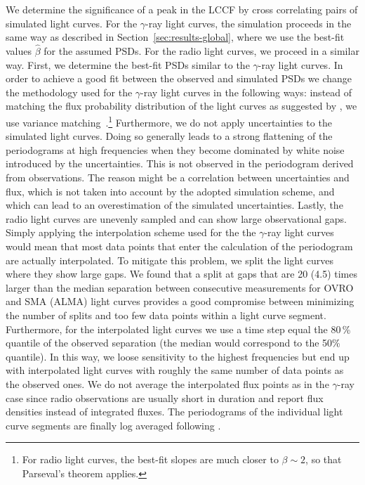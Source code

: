 \documentclass[twocolumn,linenumbers]{aastex62}
\newcommand{\gray}{$\gamma$-ray\xspace}
\begin{document}
We determine the significance of a peak in the LCCF by cross correlating pairs of simulated light curves. 
For the \gray light curves, the simulation proceeds in the same way as described in Section~\ref{sec:results-global}, where we use the best-fit values $\hat{\beta}$ for the assumed PSDs.
For the radio light curves, we proceed in a similar way. 
First, we determine the best-fit PSDs similar to the \gray light curves. 
In order to achieve a good fit between the observed and simulated PSDs we change the methodology used for the \gray light curves in the following ways:
instead of matching the flux probability distribution of the light curves as suggested by \citet{2013MNRAS.433..907E}, we use variance matching~\citep{2014MNRAS.445..437M}.\footnote{For radio light curves, the best-fit slopes are much closer to $\beta \sim 2$, so that Parseval's theorem applies.}
Furthermore, we do not apply uncertainties to the simulated light curves. 
Doing so generally leads to a strong flattening of the periodograms at high frequencies when they become dominated by white noise introduced by the uncertainties. 
This is not observed in the periodogram derived from observations. 
The reason might be a correlation between uncertainties and flux, which is not taken into account by the adopted simulation scheme, and which can lead to an overestimation of the simulated uncertainties.
Lastly, the radio light curves are unevenly sampled and can show large observational gaps. 
Simply applying the interpolation scheme used for the the \gray light curves would mean that most data points that enter the calculation of the periodogram are actually interpolated. 
To mitigate this problem, we split the light curves where they show large gaps. 
We found that a split at gaps that are 20 (4.5) times larger than the median separation between consecutive measurements for OVRO and SMA (ALMA) light curves provides a good compromise between minimizing the number of splits and too few data points within a light curve segment. 
Furthermore, for the interpolated light curves we use a time step equal the 80\,\% quantile of the observed separation (the median would correspond to the 50\% quantile). 
In this way, we loose sensitivity to the highest frequencies but end up with interpolated light curves with roughly the same number of data points as the observed ones. 
We do not average the interpolated flux points as in the \gray case since radio observations are usually short in duration and report flux densities instead of integrated fluxes. 
The periodograms of the individual light curve segments are finally log averaged following \citet{1993MNRAS.261..612P}.
\end{document}
